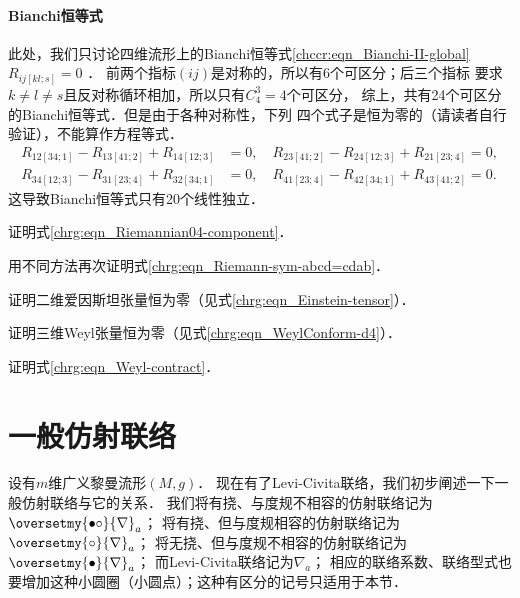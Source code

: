 \paragraph{Bianchi恒等式}\label{chrg:sec_NumOfBianchi}
此处，我们只讨论四维流形上的Bianchi恒等式\eqref{chccr:eqn_Bianchi-II-global}$R_{ij[kl;s]} = 0$ ．
前两个指标$(ij)$是对称的，所以有6个可区分；后三个指标
要求$k\neq l \neq s$且反对称循环相加，所以只有$C_4^3=4$个可区分，
综上，共有24个可区分的Bianchi恒等式．但是由于各种对称性，下列
四个式子是恒为零的（请读者自行验证），不能算作方程等式．
\begin{equation*}
    \begin{aligned}
        R_{12[34;1]} - R_{13[41;2]} + R_{14[12;3]} &=0,  \quad
        R_{23[41;2]} - R_{24[12;3]} + R_{21[23;4]} =0,  \\
        R_{34[12;3]} - R_{31[23;4]} + R_{32[34;1]} &=0,  \quad
        R_{41[23;4]} - R_{42[34;1]} + R_{43[41;2]} =0.
    \end{aligned}
\end{equation*}
这导致Bianchi恒等式只有20个线性独立．


\begin{exercise}
	证明式\eqref{chrg:eqn_Riemannian04-component}．
\end{exercise}

\begin{exercise}
	用不同方法再次证明式\eqref{chrg:eqn_Riemann-sym-abcd=cdab}．
\end{exercise}

\begin{exercise}
	证明二维爱因斯坦张量恒为零（见式\eqref{chrg:eqn_Einstein-tensor}）．
\end{exercise}

\begin{exercise}
	证明三维Weyl张量恒为零（见式\eqref{chrg:eqn_WeylConform-d4}）．
\end{exercise}

\begin{exercise}
	证明式\eqref{chrg:eqn_Weyl-contract}．
\end{exercise}



\section{一般仿射联络}\label{chrg:sec_metric-affine}

设有$m$维广义黎曼流形$(M,g)$．
现在有了Levi-Civita联络，我们初步阐述一下一般仿射联络与它的关系．
我们将有挠、与度规不相容的仿射联络记为$\oversetmy{\bullet\circ}{\nabla}_a$；
将有挠、但与度规相容的仿射联络记为$\oversetmy{\circ}{\nabla}_a$；
将无挠、但与度规不相容的仿射联络记为$\oversetmy{\bullet}{\nabla}_a$；
而Levi-Civita联络记为$\nabla_a$；
相应的联络系数、联络型式也要增加这种小圆圈（小圆点）；这种有区分的记号只适用于本节．


